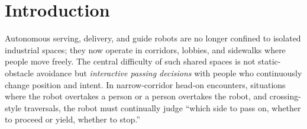 \section{Introduction}\label{sec:intro}



Autonomous serving, delivery, and guide robots are no longer confined to isolated industrial spaces; they now operate in corridors, lobbies, and sidewalks where people move freely. The central difficulty of such shared spaces is not static-obstacle avoidance but \emph{interactive passing decisions} with people who continuously change position and intent. In narrow-corridor head-on encounters, situations where the robot overtakes a person or a person overtakes the robot, and crossing-style traversals, the robot must continually judge ``which side to pass on, whether to proceed or yield, whether to stop.''

